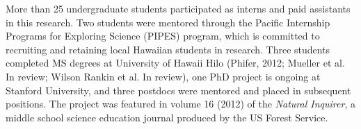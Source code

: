 \documentclass[11pt]{article}
\begin{document}
More than 25 undergraduate students participated as interns and paid
assistants in this research. Two students were mentored through the
Pacific Internship Programs for Exploring Science (PIPES) program,
which is committed to recruiting and retaining local Hawaiian students
in research. Three students completed MS degrees at University of
Hawaii Hilo (Phifer, 2012; Mueller et al. In review; Wilson Rankin et
al. In review), one PhD project is ongoing at Stanford University, and
three postdocs were mentored and placed in subsequent positions. The
project was featured in volume 16 (2012) of the {\it Natural Inquirer}, a
middle school science education journal produced by the US Forest
Service.




\vbox{}
\end{document}
